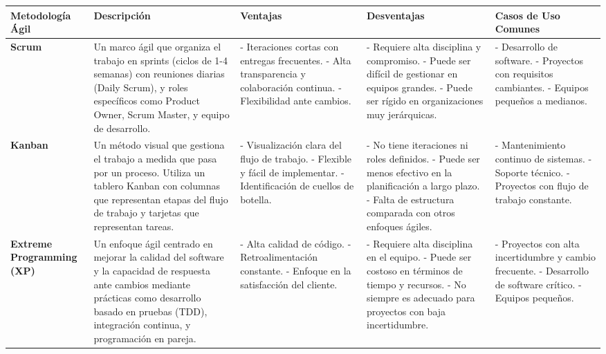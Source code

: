 \begin{enumerate}
            \begin{table}[h!]
                \centering
                \begin{tabular}{|p{}|p{}|p{}|p{}|p{}|}
                    \hline
                    \textbf{Metodología Ágil}         & \textbf{Descripción}                                                                                                                                                                                             & \textbf{Ventajas}                                                                                                        & \textbf{Desventajas}                                                                                                                                                & \textbf{Casos de Uso Comunes}                                                                                \\
                    \hline
                    \textbf{Scrum}                    & Un marco ágil que organiza el trabajo en sprints (ciclos de 1-4 semanas) con reuniones diarias (Daily Scrum), y roles específicos como Product Owner, Scrum Master, y equipo de desarrollo.                      & - Iteraciones cortas con entregas frecuentes. - Alta transparencia y colaboración continua. - Flexibilidad ante cambios. & - Requiere alta disciplina y compromiso. - Puede ser difícil de gestionar en equipos grandes. - Puede ser rígido en organizaciones muy jerárquicas.                 & - Desarrollo de software. - Proyectos con requisitos cambiantes. - Equipos pequeños a medianos.              \\
                    \hline
                    \textbf{Kanban}                   & Un método visual que gestiona el trabajo a medida que pasa por un proceso. Utiliza un tablero Kanban con columnas que representan etapas del flujo de trabajo y tarjetas que representan tareas.                 & - Visualización clara del flujo de trabajo. - Flexible y fácil de implementar. - Identificación de cuellos de botella.   & - No tiene iteraciones ni roles definidos. - Puede ser menos efectivo en la planificación a largo plazo. - Falta de estructura comparada con otros enfoques ágiles. & - Mantenimiento continuo de sistemas. - Soporte técnico. - Proyectos con flujo de trabajo constante.         \\
                    \hline
                    \textbf{Extreme Programming (XP)} & Un enfoque ágil centrado en mejorar la calidad del software y la capacidad de respuesta ante cambios mediante prácticas como desarrollo basado en pruebas (TDD), integración continua, y programación en pareja. & - Alta calidad de código. - Retroalimentación constante. - Enfoque en la satisfacción del cliente.                       & - Requiere alta disciplina en el equipo. - Puede ser costoso en términos de tiempo y recursos. - No siempre es adecuado para proyectos con baja incertidumbre.      & - Proyectos con alta incertidumbre y cambio frecuente. - Desarrollo de software crítico. - Equipos pequeños. \\

\end{tabular}
\end{table}
\end{enumerate}
